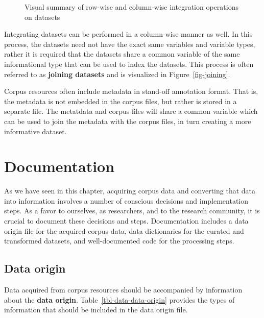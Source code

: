 \documentclass[
  letterpaper,
  krantz1]{latex/krantz-mod}
\theoremstyle{definition}
\theoremstyle{definition}
\theoremstyle{remark}
\begin{document}
\begin{figure}[!htb]
\begin{minipage}{0.55\linewidth}
{}


\end{minipage}%

\caption{\label{fig-data-integration}Visual summary of row-wise and
column-wise integration operations on datasets}

\end{figure}%

Integrating datasets can be performed in a column-wise manner as well.
In this process, the datasets need not have the exact same variables and
variable types, rather it is required that the datasets share a common
variable of the same informational type that can be used to index the
datasets. This process is often referred to as \textbf{joining datasets}
and is visualized in Figure~\ref{fig-joining}.

Corpus resources often include metadata in stand-off annotation format.
That is, the metadata is not embedded in the corpus files, but rather is
stored in a separate file. The metatdata and corpus files will share a
common variable which can be used to join the metadata with the corpus
files, in turn creating a more informative dataset.

\section{Documentation}\label{sec-data-documentation}

As we have seen in this chapter, acquiring corpus data and converting
that data into information involves a number of conscious decisions and
implementation steps. As a favor to ourselves, as researchers, and to
the research community, it is crucial to document these decisions and
steps. Documentation includes a data origin file for the acquired corpus
data, data dictionaries for the curated and transformed datasets, and
well-documented code for the processing steps.

\subsection{Data origin}\label{sec-data-data-origin}

Data acquired from corpus resources should be accompanied by information
about the \textbf{data origin}. Table~\ref{tbl-data-data-origin}
provides the types of information that should be included in the data
origin file.
\end{document}
